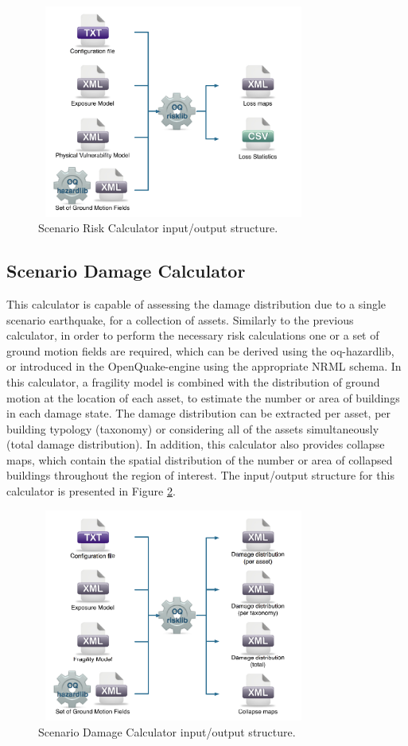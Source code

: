 \begin{figure}[ht]
\centering
\includegraphics[width=9cm,height=7cm]{figures/risk/ScenarioRisk.pdf}
\caption{Scenario Risk Calculator input/output structure.}
\label{fig:ScnRisk}
\end{figure}

\subsection{Scenario Damage Calculator}
This calculator is capable of assessing the damage distribution due to a single scenario earthquake, for a collection of assets. Similarly to the previous calculator, in order to perform the necessary risk calculations one or a set of ground motion fields are required, which can be derived using the oq-hazardlib, or introduced in the OpenQuake-engine using the appropriate NRML schema.
In this calculator, a fragility model is combined with the distribution of ground motion at the location of each asset, to estimate the number or area of buildings in each damage state. The damage distribution can be extracted per asset, per building typology (taxonomy) or considering all of the assets simultaneously (total damage distribution). In addition, this calculator also provides collapse maps, which contain the spatial distribution of the number or area of collapsed buildings throughout the region of interest. The input/output structure for this calculator is presented in Figure \ref{fig:ScnDamage}.

\begin{figure}[ht]
\centering
\includegraphics[width=9cm,height=7cm]{figures/risk/ScenarioDamage.pdf}
\caption{Scenario Damage Calculator input/output structure.}
\label{fig:ScnDamage}
\end{figure}

